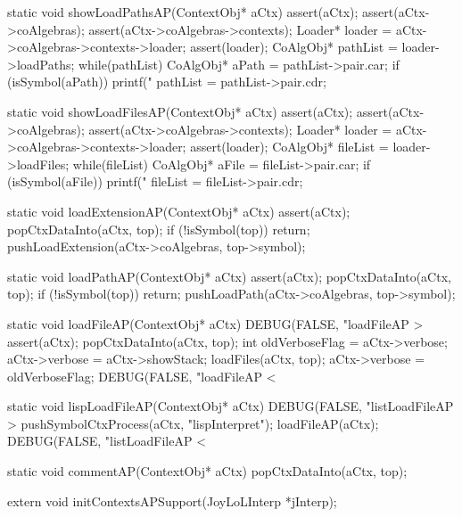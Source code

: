 static void showLoadPathsAP(ContextObj* aCtx) {
  assert(aCtx);
  assert(aCtx->coAlgebras);
  assert(aCtx->coAlgebras->contexts);
  Loader* loader = aCtx->coAlgebras->contexts->loader;
  assert(loader);
  CoAlgObj* pathList = loader->loadPaths;
  while(pathList) {
    CoAlgObj* aPath = pathList->pair.car;
    if (isSymbol(aPath)) printf("%
    pathList = pathList->pair.cdr;
  }
}

static void showLoadFilesAP(ContextObj* aCtx) {
  assert(aCtx);
  assert(aCtx->coAlgebras);
  assert(aCtx->coAlgebras->contexts);
  Loader* loader = aCtx->coAlgebras->contexts->loader;
  assert(loader);
  CoAlgObj* fileList = loader->loadFiles;
  while(fileList) {
    CoAlgObj* aFile = fileList->pair.car;
    if (isSymbol(aFile)) printf("%
    fileList = fileList->pair.cdr;
  }
}

static void loadExtensionAP(ContextObj* aCtx) {
  assert(aCtx);
  popCtxDataInto(aCtx, top);
  if (!isSymbol(top)) return;
  pushLoadExtension(aCtx->coAlgebras, top->symbol);
}

static void loadPathAP(ContextObj* aCtx) {
  assert(aCtx);
  popCtxDataInto(aCtx, top);
  if (!isSymbol(top)) return;
  pushLoadPath(aCtx->coAlgebras, top->symbol);
}

static void loadFileAP(ContextObj* aCtx) {
  DEBUG(FALSE, "loadFileAP > %
  assert(aCtx);
  popCtxDataInto(aCtx, top);
  int oldVerboseFlag = aCtx->verbose;
  aCtx->verbose = aCtx->showStack;
  loadFiles(aCtx, top);
  aCtx->verbose = oldVerboseFlag;
  DEBUG(FALSE, "loadFileAP < %
}

static void lispLoadFileAP(ContextObj* aCtx) {
  DEBUG(FALSE, "listLoadFileAP > %
  pushSymbolCtxProcess(aCtx, "lispInterpret");
  loadFileAP(aCtx);
  DEBUG(FALSE, "listLoadFileAP < %
}
\stoptyping

\startCCode
static void commentAP(ContextObj* aCtx) {
  popCtxDataInto(aCtx, top);
}
\stopCCode

\startCHeader
extern void initContextsAPSupport(JoyLoLInterp *jInterp);
\stopCHeader


